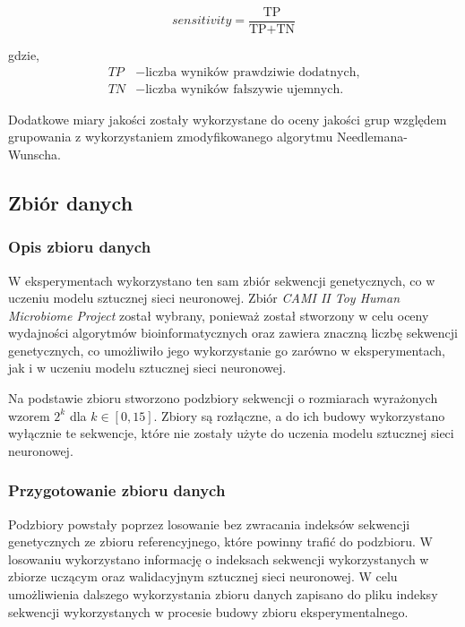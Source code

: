         \begin{equation}
            sensitivity = \frac{\text{TP}}{
                \text{TP} + \text{TN}
            }
        \end{equation}

        gdzie,
        \begin{align*}
            TP &- \text{liczba wyników prawdziwie dodatnych,} \\
            TN &- \text{liczba wyników fałszywie ujemnych.}
        \end{align*}

        Dodatkowe miary jakości zostały wykorzystane do oceny jakości grup względem grupowania z wykorzystaniem zmodyfikowanego algorytmu Needlemana-Wunscha.

    \subsection{Zbiór danych}

        \subsubsection{Opis zbioru danych}
        
            W eksperymentach wykorzystano ten sam zbiór sekwencji genetycznych, co w uczeniu modelu sztucznej sieci neuronowej. Zbiór \textit{CAMI II Toy Human Microbiome Project}\cite{Fritz2019} został wybrany, ponieważ został stworzony w celu oceny wydajności algorytmów bioinformatycznych oraz zawiera znaczną liczbę sekwencji genetycznych, co umożliwiło jego wykorzystanie go zarówno w eksperymentach, jak i w uczeniu modelu sztucznej sieci neuronowej.
            
            Na podstawie zbioru stworzono podzbiory sekwencji o rozmiarach wyrażonych wzorem $2^k$ dla $k \in [0, 15]$. Zbiory są rozłączne, a do ich budowy wykorzystano wyłącznie te sekwencje, które nie zostały użyte do uczenia modelu sztucznej sieci neuronowej.

        \subsubsection{Przygotowanie zbioru danych}

            Podzbiory powstały poprzez losowanie bez zwracania indeksów sekwencji genetycznych ze zbioru referencyjnego, które powinny trafić do podzbioru. W losowaniu wykorzystano informację o indeksach sekwencji wykorzystanych w zbiorze uczącym oraz walidacyjnym sztucznej sieci neuronowej. W celu umożliwienia dalszego wykorzystania zbioru danych zapisano do pliku indeksy sekwencji wykorzystanych w procesie budowy zbioru eksperymentalnego.

